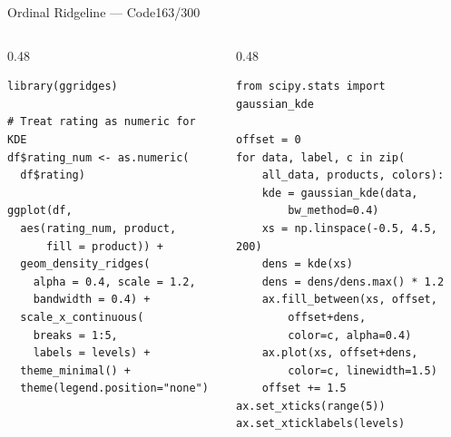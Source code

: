 \documentclass[10pt]{beamer}
\newcommand{\smark}[1]{\hfill{\scriptsize\color{codegray}#1}}
\begin{document}
\begin{frame}[fragile]{Ordinal Ridgeline --- Code}\smark{163/300}
\begin{columns}[T]
\begin{column}{0.48\textwidth}
\begin{lstlisting}[style=Rstyle]
library(ggridges)

# Treat rating as numeric for KDE
df$rating_num <- as.numeric(
  df$rating)

ggplot(df,
  aes(rating_num, product,
      fill = product)) +
  geom_density_ridges(
    alpha = 0.4, scale = 1.2,
    bandwidth = 0.4) +
  scale_x_continuous(
    breaks = 1:5,
    labels = levels) +
  theme_minimal() +
  theme(legend.position="none")
\end{lstlisting}
\end{column}
\begin{column}{0.48\textwidth}
\begin{lstlisting}[style=Pystyle]
from scipy.stats import gaussian_kde

offset = 0
for data, label, c in zip(
    all_data, products, colors):
    kde = gaussian_kde(data,
        bw_method=0.4)
    xs = np.linspace(-0.5, 4.5, 200)
    dens = kde(xs)
    dens = dens/dens.max() * 1.2
    ax.fill_between(xs, offset,
        offset+dens,
        color=c, alpha=0.4)
    ax.plot(xs, offset+dens,
        color=c, linewidth=1.5)
    offset += 1.5
ax.set_xticks(range(5))
ax.set_xticklabels(levels)
\end{lstlisting}
\end{column}
\end{columns}
\end{frame}
\end{document}
